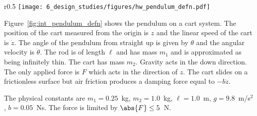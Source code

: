 


\begin{wrapfigure}{r}{0.5\textwidth}
  \texttt{[image: 6\_design\_studies/figures/hw\_pendulum\_defn.pdf]}\\
  \caption{Pendulum on a cart.}
  \label{fig:int_pendulum_defn}
\end{wrapfigure}

Figure~\ref{fig:int_pendulum_defn} shows the pendulum on a cart system.  The position of the cart measured from the origin is $z$ and the linear speed of the cart is $\dot{z}$.  The angle of the pendulum from straight up is given by $\theta$ and the angular velocity is $\dot{\theta}$.  The rod is of length $\ell$ and has mass $m_1$ and is approximated as being infinitely thin. The cart has mass $m_2$.  Gravity acts in the down direction.  The only applied force is $F$ which acts in the direction of $z$.  The cart slides on a frictionless surface but air friction produces a damping force equal to $-b\dot{z}$.

The physical constants are $m_1=0.25$~kg, $m_2=1.0$~kg, $\ell=1.0$~m, $g=9.8$~m/s$^2$, $b=0.05$~Ns.  The force is limited by $\abs{F}\leq 5$~N.
